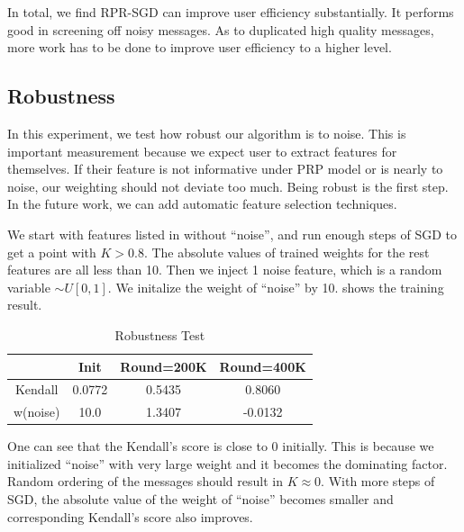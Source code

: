 \documentclass{sig-alternate}
\begin{document}
In total, we find RPR-SGD can improve user efficiency substantially. 
It performs good in screening off noisy messages. 
As to duplicated high quality messages, more work has to be done 
to improve user efficiency to a higher level. 

\subsection{Robustness}
\label{sec:Robustness}

In this experiment, we test how robust our algorithm is to noise. 
This is important measurement because we expect user to extract features for themselves. 
If their feature is not informative under PRP model or is nearly to noise, 
our weighting should not deviate too much. 
Being robust is the first step.
In the future work, we can add automatic feature selection techniques.

We start with features listed in \rtbl{\ref{tbl:feature}} without ``noise'', 
and run enough steps of SGD to get a point with $K>0.8$. 
The absolute values of trained weights for the rest features are all less than 10. 
Then we inject 1 noise feature, which is a random variable $\sim U[0,1]$. 
We initalize the weight of ``noise'' by 10.
\rtbl{\ref{tbl:noise}} shows the training result. 

\begin{table}[htb]
	\centering
	\caption{Robustness Test}
	\label{tbl:noise}
	\begin{tabular}{c|c|c|c}
		\hline 
		& Init & Round=200K & Round=400K \\
		\hline 
		Kendall & 0.0772 & 0.5435 & 0.8060 \\
		 w(noise) & 10.0 & 1.3407 & -0.0132 \\
		\hline
	\end{tabular}
\end{table}

One can see that the Kendall's score is close to 0 initially. 
This is because we initialized ``noise'' with very large weight
and it becomes the dominating factor. 
Random ordering of the messages should result in $K \approx 0$. 
With more steps of SGD, the absolute value of the weight of ``noise'' becomes smaller
and corresponding Kendall's score also improves. 
\end{document}
